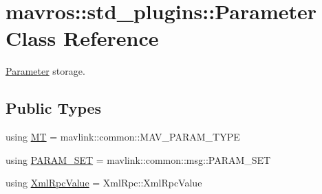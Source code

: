 \hypertarget{classmavros_1_1std__plugins_1_1Parameter}{}\section{mavros\+::std\+\_\+plugins\+::Parameter Class Reference}
\label{classmavros_1_1std__plugins_1_1Parameter}


\mbox{\hyperlink{classmavros_1_1std__plugins_1_1Parameter}{Parameter}} storage.  


\subsection*{Public Types}
\begin{DoxyCompactItemize}
\item 
using \mbox{\hyperlink{group__plugin_ga7d57778649dff1fd8c9aaf2599ff5238}{MT}} = mavlink\+::common\+::\+M\+A\+V\+\_\+\+P\+A\+R\+A\+M\+\_\+\+T\+Y\+PE
\item 
using \mbox{\hyperlink{group__plugin_gaa94f933e0249802ee1985cb650408c31}{P\+A\+R\+A\+M\+\_\+\+S\+ET}} = mavlink\+::common\+::msg\+::\+P\+A\+R\+A\+M\+\_\+\+S\+ET
\item 
using \mbox{\hyperlink{group__plugin_gafe570e1ad21e55964c02084e1a485c92}{Xml\+Rpc\+Value}} = Xml\+Rpc\+::\+Xml\+Rpc\+Value
\end{DoxyCompactItemize}
